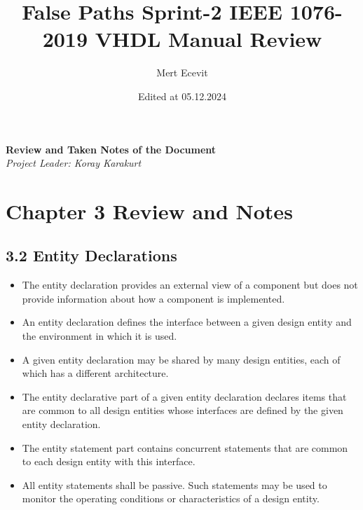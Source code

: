 \documentclass[a4paper,12pt]{article}
\title{False Paths Sprint-2 IEEE 1076-2019 VHDL Manual Review}
\author{Mert Ecevit}
\date{Edited at 05.12.2024}
\begin{document}
	
	\maketitle
	\begin{center}
		\textbf{Review and Taken Notes of the Document} \\
		\vspace{1em}
		\textit{Project Leader: Koray Karakurt}
	\end{center}
	
	\newpage
	
	\section*{Chapter 3 Review and Notes}
	
	\subsection*{3.2 Entity Declarations}
	\begin{itemize}[noitemsep]
		\item The entity declaration provides an external view of a component but does not provide information about how a component is implemented.
		\item An entity declaration defines the interface between a given design entity and the environment in which it is used.
		\item A given entity declaration may be shared by many design entities, each of which has a different architecture.
		\item The entity declarative part of a given entity declaration declares items that are common to all design entities whose interfaces are defined by the given entity declaration.
		\item The entity statement part contains concurrent statements that are common to each design entity with this interface.
		\item All entity statements shall be passive. Such statements may be used to monitor the operating conditions or characteristics of a design entity.
	\end{itemize}
	
\end{document}
